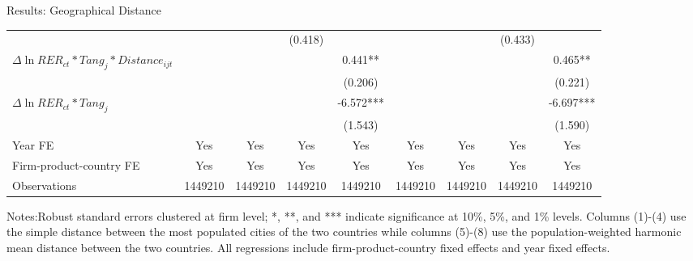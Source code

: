 \documentclass[10pt]{beamer}
\begin{document}
\begin{frame}{Results: Geographical Distance}
\begin{table}[htbp]
{\begin{threeparttable}
\begin{tabular}{lcccccccc}
				&    &       & (0.418) &       &       &       & (0.433) &  \\
				$\Delta \ln RER_{ct}*Tang_{j}*Distance_{ijt}$ &     &       &       & 0.441** &       &       &       & 0.465** \\
				&    &       &       & (0.206) &       &       &       & (0.221) \\
				$\Delta \ln RER_{ct}*Tang_{j}$ &    &       &       & -6.572*** &       &       &       & -6.697*** \\
				&     &       &       & (1.543) &       &       &       & (1.590) \\
				Year FE  & Yes   & Yes   & Yes   & Yes & Yes   & Yes   & Yes   & Yes\\
				Firm-product-country FE & Yes   & Yes   & Yes   & Yes & Yes   & Yes   & Yes   & Yes\\
				Observations & 1449210 & 1449210 & 1449210 & 1449210 & 1449210 & 1449210 & 1449210 & 1449210\\
				\bottomrule
			\end{tabular}
			\begin{tablenotes}
				\footnotesize
				\item Notes:Robust standard errors clustered at firm level; *, **, and *** indicate significance at 10\%, 5\%, and 1\% levels. Columns (1)-(4) use the simple distance between the most populated cities of the two countries while columns (5)-(8) use the population-weighted harmonic mean distance between the two countries. All regressions include firm-product-country fixed effects and year fixed effects.
			\end{tablenotes}
		\end{threeparttable}
	}
	\label{tab.source.distance}
    \hyperlink{tab.source}{}
    \end{table}
\end{frame}
\end{document}
